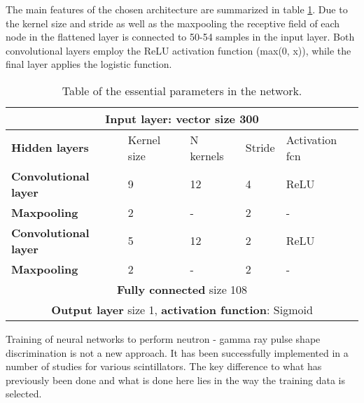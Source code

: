 \documentclass[main.tex]{subfiles}
\begin{document}
The main features of the chosen architecture are summarized in table \ref{tab:architecture}. Due to the kernel size and stride as well as the maxpooling the receptive field of each node in the flattened layer is connected to 50-54 samples in the input layer. Both convolutional layers employ the ReLU activation function (max(0, x)), while the final layer applies the logistic function.
\begin{table}[hb]
\center
\begin{tabular}{|l|l|l|l|l|}
\hline
\multicolumn{5}{|c|}{\textbf{Input layer}: vector size 300}                                            \\ \hline
\textbf{Hidden layers}       & Kernel size & N kernels & Stride & Activation fcn \\ \hline
\textbf{Convolutional layer} & 9           & 12                & 4             & ReLU                \\ \hline
\textbf{Maxpooling}          & 2           & -                 & 2             & -                   \\ \hline
\textbf{Convolutional layer} & 5           & 12                & 2             & ReLU                \\ \hline
\textbf{Maxpooling}          & 2           & -                 & 2             & -                   \\ \hline
\multicolumn{5}{|c|}{\textbf{Fully connected} size 108}
\\ \hline
\multicolumn{5}{|c|}{\textbf{Output layer} size 1, \textbf{activation function}: Sigmoid}               \\ \hline
\end{tabular}
\caption{Table of the essential parameters in the network.}
\label{tab:architecture}
\end{table}

Training of neural networks to perform neutron - gamma ray pulse shape discrimination is not a new approach. It has been successfully implemented in a number of studies for various scintillators. The key difference to what has previously been done and what is done here lies in the way the training data is selected.
\end{document}
